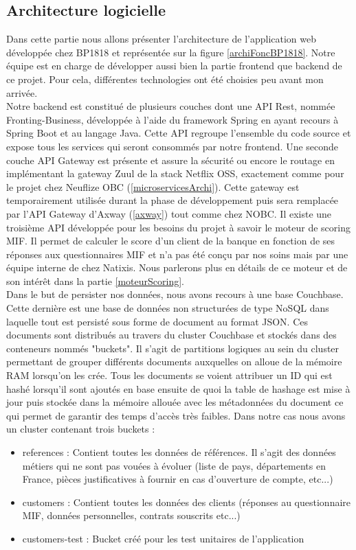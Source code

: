 \subsection{Architecture logicielle}

	Dans cette partie nous allons présenter l'architecture de l'application web développée chez BP1818 et représentée sur la figure \ref{archiFoncBP1818}. Notre équipe est en charge de développer aussi bien la partie frontend que backend de ce projet. Pour cela, différentes technologies ont été choisies peu avant mon arrivée. \\
	
	Notre backend est constitué de plusieurs couches dont une API Rest, nommée Fronting-Business, développée à l'aide du framework Spring en ayant recours à Spring Boot et au langage Java. Cette API regroupe l'ensemble du code source et expose tous les services qui seront consommés par notre frontend. Une seconde couche API Gateway est présente et assure la sécurité ou encore le routage en implémentant la gateway Zuul de la stack Netflix OSS, exactement comme pour le projet chez Neuflize OBC (\ref{microservicesArchi}). Cette gateway est temporairement utilisée durant la phase de développement puis sera remplacée par l'API Gateway d'Axway (\ref{axway}) tout comme chez NOBC. Il existe une troisième API développée pour les besoins du projet à savoir le moteur de scoring MIF. Il permet de calculer le score d'un client de la banque en fonction de ses réponses aux questionnaires MIF et n'a pas été conçu par nos soins mais par une équipe interne de chez Natixis. Nous parlerons plus en détails de ce moteur et de son intérêt dans la partie \ref{moteurScoring}. \\
	
	Dans le but de persister nos données, nous avons recours à une base Couchbase. Cette dernière est une base de données non structurées de type NoSQL dans laquelle tout est persisté sous forme de document au format JSON. Ces documents sont distribués au travers du cluster Couchbase et stockés dans des conteneurs nommés "buckets". Il s'agit de partitions logiques au sein du cluster permettant de grouper différents documents auxquelles on alloue de la mémoire RAM lorsqu'on les crée. Tous les documents se voient attribuer un ID qui est hashé lorsqu'il sont ajoutés en base ensuite de quoi la table de hashage est mise à jour puis stockée dans la mémoire allouée avec les métadonnées du document ce qui permet de garantir des temps d'accès très faibles. Dans notre cas nous avons un cluster contenant trois buckets :
	\begin{itemize}
		\item references : Contient toutes les données de références. Il s'agit des données métiers qui ne sont pas vouées à évoluer (liste de pays, départements en France, pièces justificatives à fournir en cas d'ouverture de compte, etc...)
		\item customers : Contient toutes les données des clients (réponses au questionnaire MIF, données personnelles, contrats souscrits etc...)
		\item customers-test : Bucket créé pour les test unitaires de l'application \\
	\end{itemize}
	
